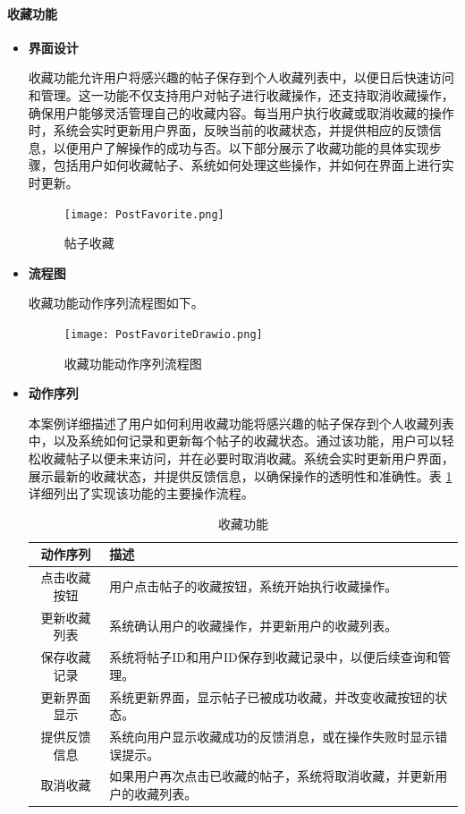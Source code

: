 \paragraph{收藏功能}

\begin{itemize}
	\item \textbf{界面设计}
	
	收藏功能允许用户将感兴趣的帖子保存到个人收藏列表中，以便日后快速访问和管理。这一功能不仅支持用户对帖子进行收藏操作，还支持取消收藏操作，确保用户能够灵活管理自己的收藏内容。每当用户执行收藏或取消收藏的操作时，系统会实时更新用户界面，反映当前的收藏状态，并提供相应的反馈信息，以便用户了解操作的成功与否。以下部分展示了收藏功能的具体实现步骤，包括用户如何收藏帖子、系统如何处理这些操作，并如何在界面上进行实时更新。
	
	\begin{figure}[H]
		\centering
		\texttt{[image: PostFavorite.png]} 
		\caption{帖子收藏}
		\label{fig:post-favorite}
	\end{figure}
	
	\item \textbf{流程图}
	
	收藏功能动作序列流程图如下。
	
	\begin{figure}[H]
		\centering
		\texttt{[image: PostFavoriteDrawio.png]} 
		\caption{收藏功能动作序列流程图}
		\label{fig:post-favorite.drawio}
	\end{figure}
	
	\item \textbf{动作序列}
	
	本案例详细描述了用户如何利用收藏功能将感兴趣的帖子保存到个人收藏列表中，以及系统如何记录和更新每个帖子的收藏状态。通过该功能，用户可以轻松收藏帖子以便未来访问，并在必要时取消收藏。系统会实时更新用户界面，展示最新的收藏状态，并提供反馈信息，以确保操作的透明性和准确性。表 \ref{table:post-favorite} 详细列出了实现该功能的主要操作流程。
	
	\begin{table}[H]
		\centering
		\caption{收藏功能}
		\renewcommand\arraystretch{1.5}
		\begin{tabular}{|c|>{\raggedright\arraybackslash}p{8cm}|}
			\hline
			\textbf{动作序列} & \textbf{描述} \\ \hline
			点击收藏按钮 & 用户点击帖子的收藏按钮，系统开始执行收藏操作。 \\ \hline
			更新收藏列表 & 系统确认用户的收藏操作，并更新用户的收藏列表。 \\ \hline
			保存收藏记录 & 系统将帖子ID和用户ID保存到收藏记录中，以便后续查询和管理。 \\ \hline
			更新界面显示 & 系统更新界面，显示帖子已被成功收藏，并改变收藏按钮的状态。 \\ \hline
			提供反馈信息 & 系统向用户显示收藏成功的反馈消息，或在操作失败时显示错误提示。 \\ \hline
			取消收藏 & 如果用户再次点击已收藏的帖子，系统将取消收藏，并更新用户的收藏列表。 \\ \hline
		\end{tabular}
		\label{table:post-favorite}
	\end{table}
	

\end{itemize}
